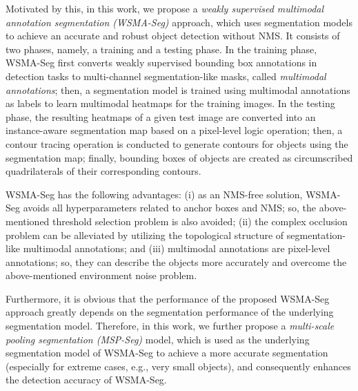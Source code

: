 \documentclass{article}
\newcommand{\eat}[1]{}
\begin{document}
Motivated by this, in this work, we propose a \emph{weakly supervised multimodal annotation segmentation (WSMA-Seg)} approach, which uses segmentation models to achieve an accurate and robust object detection without NMS. It consists of two phases, namely, a training and a testing phase. In the training phase, WSMA-Seg first converts  weakly supervised bounding box annotations in detection tasks to multi-channel segmentation-like masks, called \emph{multimodal annotations}; then, a segmentation model is trained using multimodal annotations as labels to learn multimodal heatmaps for the training images. In the testing phase, the resulting heatmaps of a given test image are converted into an instance-aware segmentation map based on a pixel-level logic operation; then, a contour tracing operation is conducted to generate contours for objects using the segmentation map; finally, bounding boxes of objects are created as circumscribed quadrilaterals of their corresponding contours.

WSMA-Seg has the following advantages: (i) as an NMS-free solution, WSMA-Seg avoids all hyperparameters related to anchor boxes and NMS; so, the above-mentioned threshold selection problem is also avoided; (ii) the complex occlusion problem can be alleviated by utilizing the topological structure of segmentation-like multimodal annotations; and (iii) multimodal annotations are pixel-level annotations; so, they can describe the objects more accurately and overcome the above-mentioned environment noise problem. 

Furthermore, it is obvious that the performance of the proposed WSMA-Seg approach greatly depends on the segmentation performance of the underlying segmentation model. Therefore, in this work, we further propose a \emph{multi-scale pooling segmentation (MSP-Seg)} model, which is used as the underlying segmentation model of WSMA-Seg to achieve a more accurate segmentation (especially for extreme cases, e.g., very small objects), and consequently enhances the detection accuracy of WSMA-Seg. 





\eat{
The contributions of this paper are briefly  as follows: 
(i) We propose a weakly supervised multimodal annotation segmentation (WSMA-Seg) approach to achieve an accurate and robust object detection without NMS, which is the first anchor-free and NMS-free object detection approach. 
(ii) We propose multimodal annotations to achieve an instance-aware segmentation using weakly supervised bounding boxes; we also 
develop a run-data-based following 
algorithm  to trace contours of objects. 
(iii) We propose a multi-scale pooling segmentation (MSP-Seg) model  to achieve a more accurate segmentation and to enhance the detection accuracy of WSMA-Seg.
(iv) We have conducted extensive experimental studies  on the Rebar Head, WIDER Face, and MS COCO datasets; the results show that the proposed WSMA-Seg approach outperforms the state-of-the-art detectors on all testing datasets.
}
\end{document}
